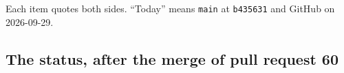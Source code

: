 \label{sec:docs-contradictions}

Each item quotes both sides. ``Today'' means \texttt{main} at \texttt{b435631} and GitHub on 2026-09-29.

\subsection{The status, after the merge of pull request 60}\label{sec:docs-status-stale}

